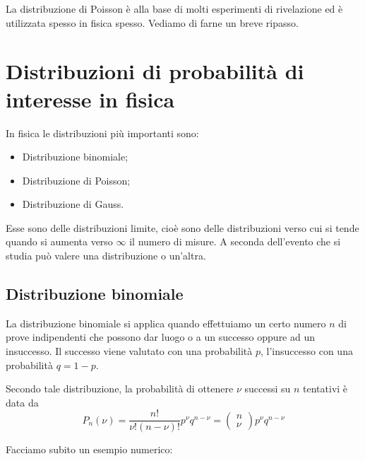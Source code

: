 La distribuzione di Poisson è alla base di molti esperimenti di rivelazione ed è utilizzata spesso in fisica spesso. Vediamo di farne un breve ripasso.

\section{Distribuzioni di probabilità di interesse in fisica}

In fisica le distribuzioni più importanti sono:

\begin{itemize}
   \item Distribuzione binomiale;
   \item Distribuzione di Poisson;
   \item Distribuzione di Gauss.
\end{itemize}

Esse sono delle distribuzioni limite, cioè sono delle distribuzioni verso cui si tende quando si aumenta verso $\infty$ il numero di misure. A seconda dell'evento che si studia può valere una distribuzione o un'altra.

\subsection{Distribuzione binomiale}

La distribuzione binomiale si applica quando effettuiamo un certo numero $n$ di prove indipendenti che possono dar luogo o a un successo oppure ad un insuccesso. Il successo viene valutato con una probabilità $p$, l'insuccesso con una probabilità $q=1-p$. 

Secondo tale distribuzione, la probabilità di ottenere $\nu$ successi su $n$ tentativi è data da
\begin{equation*}
   P_n(\nu)
   =\frac{n!}{\nu!(n - \nu)!}p^\nu q^{n - \nu}=
   \begin{pmatrix}
      n\\
      \nu
   \end{pmatrix}
   p^\nu q^{n - \nu}
\end{equation*}

Facciamo subito un esempio numerico:


